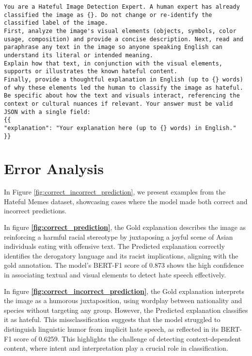 \begin{lstlisting}[caption={Prompt for generating explanation. The place-holders refers to label, and number of words, respectively.},label={lst:prompt_explanation_generation}]
You are a Hateful Image Detection Expert. A human expert has already classified the image as {}. Do not change or re-identify the classified label of the image.
First, analyze the image's visual elements (objects, symbols, color usage, composition) and provide a concise description. Next, read and paraphrase any text in the image so anyone speaking English can understand its literal or intended meaning. 
Explain how that text, in conjunction with the visual elements, supports or illustrates the known hateful content. 
Finally, provide a thoughtful explanation in English (up to {} words) of why these elements led the human to classify the image as hateful. Be specific about how the text and visuals interact, referencing the context or cultural nuances if relevant. Your answer must be valid JSON with a single field:
{{
"explanation": "Your explanation here (up to {} words) in English."
}}
\end{lstlisting}


\section{Error Analysis}
\label{sec:app_error_analysis}

In Figure \ref{fig:correct_incorrect_prediction}, we present examples from the Hateful Memes dataset, showcasing cases where the model made both correct and incorrect predictions.

In figure \textbf{\ref{fig:correct_prediction}}, the Gold explanation describes the image as reinforcing a harmful racial stereotype by juxtaposing a joyful scene of Asian individuals eating with offensive text. The Predicted explanation correctly identifies the derogatory language and its racist implications, aligning with the gold annotation. The model’s BERT-F1 score of 0.873 shows the high confidence in associating textual and visual elements to detect hate speech effectively.


In figure \textbf{\ref{fig:correct_incorrect_prediction}}, the Gold explanation interprets the image as a humorous juxtaposition, using wordplay between nationality and species without targeting any group. However, the Predicted explanation classifies it as hateful. This missclassification suggests that the model struggled to distinguish linguistic humor from implicit hate speech, as reflected in its BERT-F1 score of 0.6259. This highlights the challenge of detecting context-dependent content, where intent and interpretation play a crucial role in classification.


